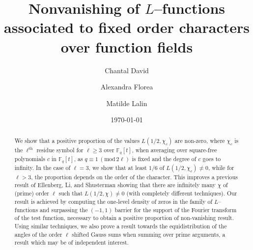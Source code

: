 \documentclass[12pt]{amsart}
\renewcommand{\pmod}[1]{\,(\mathrm{mod}\,#1)}
\begin{document}
\title{Nonvanishing of $L$--functions associated to fixed order characters over function fields }
\author{Chantal David}
\address{Department of Mathematics and Statistics, Concordia University, 1455 de Maisonneuve West, Montr\'eal, Qu\'ebec, Canada H3G 1M8}
\author{Alexandra Florea}
\address{Department of Mathematics, University of California Irvine, 340 Rowland Hall, Irvine CA 92697, USA}
\date{\today}
\author{Matilde Lalin}
\address{D\'epartement de math\'ematiques et de statistique, Universit\'e de Montr\'eal, CP 6128, succ. Centre-ville, Montr\'eal, QC H3C 3J7, Canada}

\begin{abstract}
We show that a positive proportion of the values $L(1/2,\chi_c)$ are non-zero, where $\chi_c$ is the $\ell^{\text{th}}$ residue symbol for $\ell \geq 3$ over $\mathbb{F}_q[t]$, when averaging over square-free polynomials $c$ in $\mathbb{F}_q[t]$, as $q \equiv 1 \pmod{2\ell}$ is fixed and the degree of $c$ goes to infinity. In the case of $\ell=3$, we show that at least $1/6$ of $L(1/2,\chi_c) \neq 0$, while for $\ell>3$, the proportion depends on the order of the character.
This improves a previous result of Ellenberg, Li, and Shusterman showing that there are infinitely many  $\chi$ of (prime) order $\ell$ such that $L(1/2, \chi) \neq 0$ (with completely different techniques). Our result is achieved by computing the one-level density of zeros in the family of $L$--functions and surpassing the $(-1,1)$ barrier for the support of the Fourier transform of the test function, necessary to obtain a positive proportion of non-vanishing result.
Using similar techniques, we also prove a result towards the equidistribution of the angles of the order $\ell$ shifted Gauss sums when summing over prime arguments, a result which may be of independent interest.
\end{abstract}

\maketitle
\end{document}
